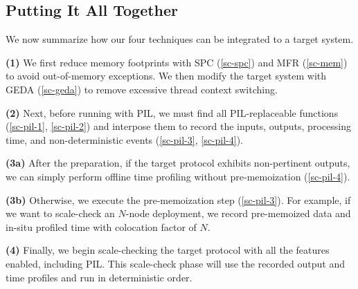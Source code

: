 


\subsection{Putting It All Together}
\label{sc-summ}





 We now summarize how our four \sck techniques
can be integrated to a target system.  


{\bf (1)} We first reduce memory footprints with SPC (\sec\ref{sc-spc})
and MFR (\sec\ref{sc-mem}) to avoid out-of-memory exceptions.  
We then modify the target system with GEDA (\sec\ref{sc-geda}) to
remove excessive thread context switching.  

{\bf (2)} Next, before running \sck with PIL, we must find all
PIL-replaceable functions (\sec\ref{sc-pil-1}, \sec\ref{sc-pil-2}) and
interpose them to record the inputs, outputs, processing time, and
non-deterministic events (\sec\ref{sc-pil-3}, \sec\ref{sc-pil-4}).

%

{\bf (3a)} After the preparation, if the target protocol exhibits
non-pertinent outputs, we can simply perform offline time profiling without
pre-memoization (\sec\ref{sc-pil-4}).

{\bf (3b)} Otherwise, we execute the pre-memoization step
(\sec\ref{sc-pil-3}).  For example,
if we want to scale-check an $N$-node deployment, 
we record pre-memoized data and in-situ profiled time with
colocation factor of $N$.  

{\bf (4)} Finally, we begin scale-checking the target protocol with all
the features enabled, including PIL.  This scale-check phase will use the
recorded output and time profiles and run in deterministic order.

